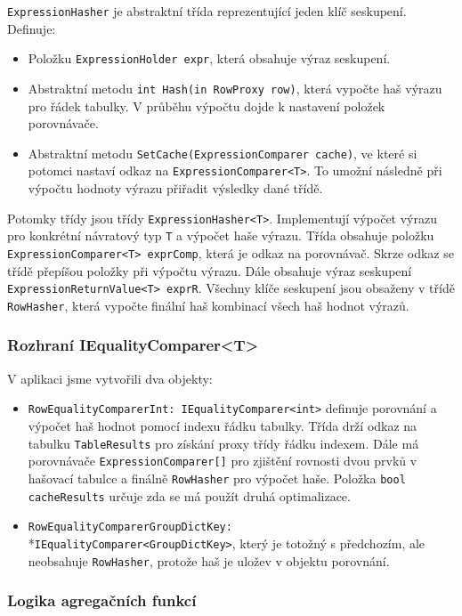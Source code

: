\texttt{ExpressionHasher} je abstraktní třída reprezentující jeden klíč seskupení.
Definuje:
\begin{itemize}
\item Položku \texttt{ExpressionHolder expr}, která obsahuje výraz seskupení.
\item Abstraktní metodu \texttt{int Hash(in RowProxy row)}, která vypočte haš výrazu pro řádek tabulky. 
V průběhu výpočtu dojde k nastavení položek porovnávače.
\item Abstraktní metodu \texttt{SetCache(ExpressionComparer cache)}, ve které si potomci nastaví odkaz na \texttt{ExpressionComparer<T>}.
To umožní následně při výpočtu hodnoty výrazu přiřadit výsledky dané třídě.
\end{itemize}
Potomky třídy jsou třídy \texttt{ExpressionHasher<T>}.
Implementují výpočet výrazu pro konkrétní návratový typ \texttt{T} a výpočet haše výrazu.
Třída obsahuje položku \texttt{ExpressionComparer<T> exprComp}, která je odkaz na porovnávač. 
Skrze odkaz se třídě přepíšou položky při výpočtu výrazu.
Dále obsahuje výraz seskupení \texttt{ExpressionReturnValue<T> exprR}.
Všechny klíče seskupení jsou obsaženy v třídě \texttt{RowHasher}, která vypočte finální haš kombinací všech haš hodnot výrazů. 

\subsubsection{Rozhraní IEqualityComparer<T>}

V aplikaci jsme vytvořili dva objekty:
\begin{itemize}
\item \texttt{RowEqualityComparerInt: IEqualityComparer<int>} definuje porovnání a výpočet haš hodnot pomocí indexu řádku tabulky.
Třída drží odkaz na tabulku \texttt{TableResults} pro získání proxy třídy řádku indexem.
Dále má porovnávače \texttt{ExpressionComparer[]} pro zjištění rovnosti dvou prvků v hašovací tabulce a finálně \texttt{RowHasher} pro výpočet haše.
Položka \texttt{bool cacheResults} určuje zda se má použít druhá optimalizace.
\item \texttt{RowEqualityComparerGroupDictKey:} \\*\texttt{IEqualityComparer<GroupDictKey>}, který je totožný s předchozím, ale neobsahuje \texttt{RowHasher}, protože haš je uložev v objektu porovnání.
\end{itemize}

\subsubsection{Logika agregačních funkcí}

